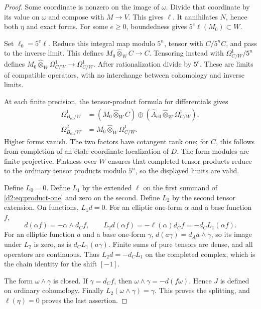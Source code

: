 \documentclass[11pt,a4paper]{amsart}
\numberwithin{equation}{section}
\theoremstyle{definition}
\theoremstyle{remark}
\newcommand{\Dtwowh}{\widehat}
\newcommand{\Dtwoct}{\widehat\otimes}
\begin{document}
\begin{proof}
Some coordinate is nonzero on the image of \(\omega\).
Divide that coordinate by its value on \(\omega\) and compose with
\(M\to V\). This gives \(\ell\).
It annihilates \(N\), hence both \(\eta\) and exact forms.
For some \(e\ge0\), boundedness gives \(5^e\ell(M_0)\subset W\).

Set \(\ell_0=5^e\ell\).
Reduce this integral map modulo \(5^n\), tensor with \(C/5^nC\),
and pass to the inverse limit.
This defines \(M_0\Dtwoct_WC\to C\).
Tensoring instead with \(\Omega^1_{C/W}/5^n\) defines
\(M_0\Dtwoct_W\Omega^1_{C/W}\to\Omega^1_{C/W}\).
After rationalization divide by \(5^e\).
These are limits of compatible operators, with no interchange
between cohomology and inverse limits.

At each finite precision, the tensor-product formula for
differentials gives
\begin{align}
 \Omega^1_{B_{\mathrm{ell}}/W}
 &=(M_0\Dtwoct_WC)\oplus
   (\Dtwowh A_{\mathrm{ell}}\Dtwoct_W\Omega^1_{C/W}),\label{d2:eq:product-one}\\
 \Omega^2_{B_{\mathrm{ell}}/W}
 &=M_0\Dtwoct_W\Omega^1_{C/W}.\label{d2:eq:product-two}
\end{align}
Higher forms vanish.
The two factors have cotangent rank one; for \(C\), this follows
from completion of an \'etale-coordinate localization of \(D\).
The form modules are finite projective.
Flatness over \(W\) ensures that completed tensor products reduce to
the ordinary tensor products modulo \(5^n\), so the displayed limits
are valid.

Define \(L_0=0\).
Define \(L_1\) by the extended \(\ell\) on the first summand of
\eqref{d2:eq:product-one} and zero on the second.
Define \(L_2\) by the second tensor extension.
On functions, \(L_1d=0\).
For an elliptic one-form \(\alpha\) and a base function \(f\),
\[
 d(\alpha f)=-\alpha\wedge d_Cf,\qquad
 L_2d(\alpha f)=-\ell(\alpha)d_Cf=-d_CL_1(\alpha f).
\]
For an elliptic function \(a\) and a base one-form \(\gamma\),
\(d(a\gamma)=d_Aa\wedge\gamma\), so its image under \(L_2\) is
zero, as is \(d_CL_1(a\gamma)\).
Finite sums of pure tensors are dense, and all operators are
continuous. Thus \(L_2d=-d_CL_1\) on the completed complex, which is
the chain identity for the shift \([-1]\).

The form \(\omega\wedge\gamma\) is closed.
If \(\gamma=d_Cf\), then
\(\omega\wedge\gamma=-d(f\omega)\).
Hence \(J\) is defined on ordinary cohomology.
Finally \(L_2(\omega\wedge\gamma)=\gamma\).
This proves the splitting, and \(\ell(\eta)=0\) proves the last
assertion.
\end{proof}
\end{document}
